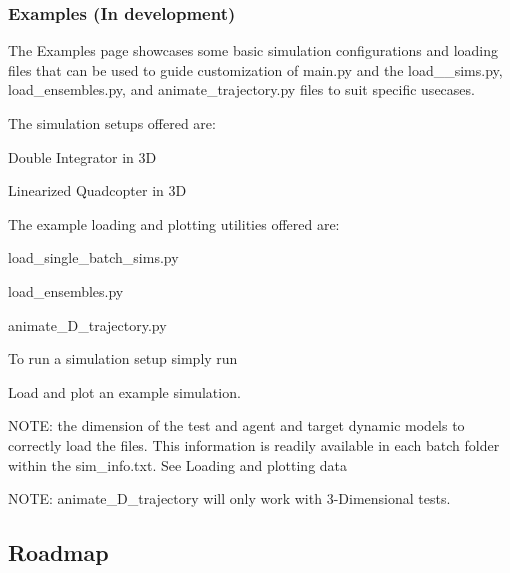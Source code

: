\subsubsection*{Examples (In development)}

The Examples page showcases some basic simulation configurations and loading files that can be used to guide customization of main.\+py and the load\+\_\+\+\_\+sims.\+py, load\+\_\+ensembles.\+py, and animate\+\_\+trajectory.\+py files to suit specific usecases.

The simulation setups offered are\+:
\begin{DoxyItemize}
\item Double Integrator in 3D
\item Linearized Quadcopter in 3D
\end{DoxyItemize}

The example loading and plotting utilities offered are\+:
\begin{DoxyItemize}
\item load\+\_\+single\+\_\+batch\+\_\+sims.\+py
\item load\+\_\+ensembles.\+py
\item animate\+\_\+D\+\_\+trajectory.\+py
\end{DoxyItemize}

To run a simulation setup simply run 
\begin{DoxyCode}{0}
\end{DoxyCode}


Load and plot an example simulation. 
\begin{DoxyCode}{0}
\end{DoxyCode}


N\+O\+TE\+: the dimension of the test and agent and target dynamic models to correctly load the files. This information is readily available in each batch folder within the sim\+\_\+info.\+txt. See \textquotesingle{}Loading and plotting data\textquotesingle{}

N\+O\+TE\+: animate\+\_\+D\+\_\+trajectory will only work with 3-\/Dimensional tests.

\subsection*{Roadmap}

